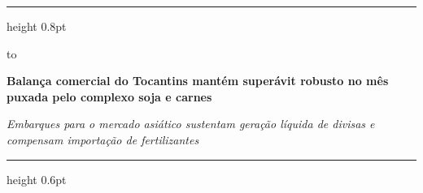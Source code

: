 \documentclass[10pt,a4paper]{article}
\begin{document}
\color{cinzatexto}

%
\par\vspace{2pt}%
{\color{douradoto}\hrule height 0.8pt}%
\par\vspace{6pt}%
\noindent\hbox to %
\par\vspace{5pt}%
{\fontsize{14.5}{17.4}\selectfont\bfseries\color{corprimaria}Balança comercial do Tocantins mantém superávit robusto no mês puxada pelo complexo soja e carnes\par}%
\vspace{3pt}%
{\footnotesize\itshape\color{cinzasub}Embarques para o mercado asiático sustentam geração líquida de divisas e compensam importação de fertilizantes\par}%
\par\vspace{6pt}%
{\color{cinzaborda}\hrule height 0.6pt}%

\vspace{0.14cm}
\end{document}
